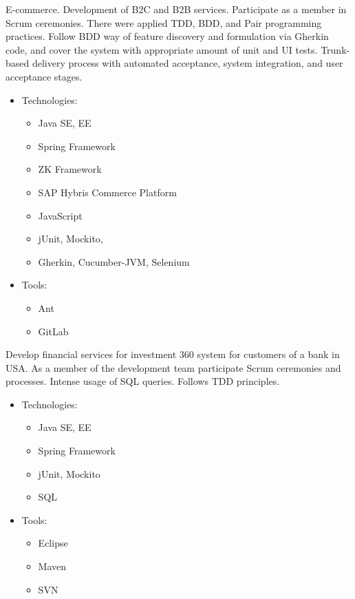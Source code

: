 \documentclass[11pt, a4paper]{moderncv}
\begin{document}
{\begin{itemize}
{E-commerce. Development of B2C and B2B services. Participate as a member in Scrum ceremonies. There were applied TDD, BDD, and Pair programming practices. Follow BDD way of feature discovery and formulation via Gherkin code, and cover the system with appropriate amount of unit and UI tests. Trunk-based delivery process with automated acceptance, system integration, and user acceptance stages.
\begin{itemize}
\item Technologies:
\begin{itemize}
\item Java SE, EE
\item Spring Framework
\item ZK Framework
\item SAP Hybris Commerce Platform
\item JavaScript
\item jUnit, Mockito, 
\item Gherkin, Cucumber-JVM, Selenium
\end{itemize}
\item Tools:
\begin{itemize}
\item Ant
\item GitLab
\end{itemize}
\end{itemize}}

{Develop financial services for investment 360 system for customers of a bank in USA. As a member of the development team participate Scrum ceremonies and processes. Intense usage of SQL queries. Follows TDD principles.
\begin{itemize}
\item Technologies:
\begin{itemize}
\item Java SE, EE
\item Spring Framework
\item jUnit, Mockito
\item SQL
\end{itemize}
\item Tools:
\begin{itemize}
\item Eclipse
\item Maven
\item SVN
\end{itemize}
\end{itemize}}


\end{itemize}}
\end{document}
